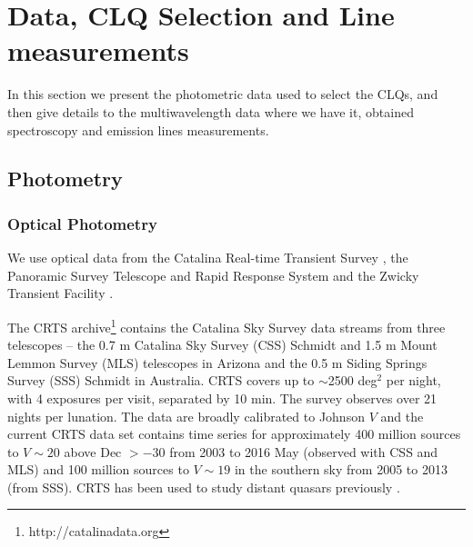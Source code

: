 \documentclass[a4paper,fleqn,usenatbib]{mnras}
\begin{document}
\section{Data, CLQ Selection and Line measurements}
In this section we present the photometric data used to select the CLQs, and then
give details to the multiwavelength data where we have it, obtained spectroscopy and
emission lines measurements. 

\subsection{Photometry}
\subsubsection{Optical Photometry}
We use optical data from the Catalina Real-time Transient Survey
\citep[CRTS;][]{Drake2009, Mahabal2011}, the Panoramic Survey
Telescope and Rapid Response System \citep[PanSTARRS;][]{Kaiser2010,
Stubbs2010, Tonry2012, Magnier2013} and the Zwicky Transient Facility
\citep[ZTF;][]{Bellm2019_ZTFOverview}. 

The CRTS archive\footnote{http://catalinadata.org} contains the
Catalina Sky Survey data streams from three telescopes -- the 0.7 m
Catalina Sky Survey (CSS) Schmidt and 1.5 m Mount Lemmon Survey (MLS)
telescopes in Arizona and the 0.5 m Siding Springs Survey (SSS)
Schmidt in Australia. 
CRTS covers up to $\sim$2500 deg$^2$ per night, with 4 exposures per visit, separated
by 10 min. The survey observes over 21 nights per lunation. The data
are broadly calibrated to Johnson $V$ \citep[see ][for details]{Drake2013}
and the current CRTS data set contains time series for
approximately 400 million sources to $V \sim 20$ above Dec $> -30$
from 2003 to 2016 May (observed with CSS and MLS) and 100 million
sources to $V \sim 19$ in the southern sky from 2005 to 2013 (from
SSS). CRTS has been used to study distant quasars previously
\citep{Graham2014, Graham2015, Graham2015Nature, Graham2017, Graham2019b}.
\end{document}
